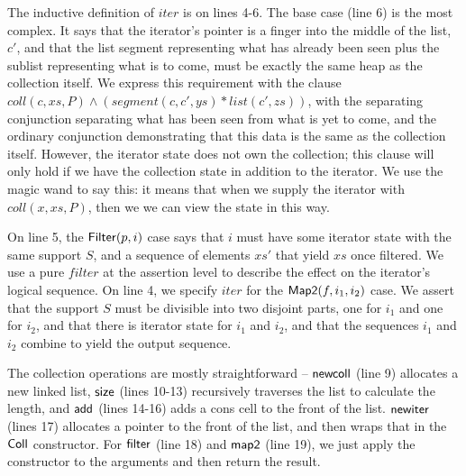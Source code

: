 \documentclass[preprint,natbib]{sigplanconf}
\begin{document}
The inductive definition of $iter$ is on lines 4-6. The base case
(line 6) is the most complex. It says that the iterator's pointer is a
finger into the middle of the list, $c'$, and that the list segment
representing what has already been seen plus the sublist representing
what is to come, must be exactly the same heap as the collection
itself. We express this requirement with the clause $coll(c, xs, P)
\land (segment(c,c',ys) * list(c',zs))$, with the separating
conjunction separating what has been seen from what is yet to come,
and the ordinary conjunction demonstrating that this data is the same
as the collection itself.  However, the iterator state does not own
the collection; this clause will only hold if we have the collection
state in addition to the iterator. We use the magic wand to say this:
it means that when we supply the iterator with $coll(x, xs, P)$, then
we we can view the state in this way.

On line 5, the $\mbox{\textsf{{Filter}}}(p,i)$
case says that $i$ must have some iterator state with the same support
$S$, and a sequence of elements $xs'$ that yield $xs$ once
filtered. We use a pure $filter$ at the assertion level to describe
the effect on the iterator's logical sequence. On line 4, we specify
$iter$ for the $\mbox{\textsf{{Map2}}}(f, i_1, i_2)$ case. We assert that the
support $S$ must be divisible into two disjoint parts, one for $i_1$
and one for $i_2$, and that there is iterator state for $i_1$ and
$i_2$, and that the sequences $i_1$ and $i_2$ combine to yield the
output sequence.

The collection operations are mostly straightforward --
$\mbox{\textsf{{newcoll}}}$ (line 9) allocates a new linked list, $\mbox{\textsf{{size}}}$
(lines 10-13) recursively traverses the list to calculate the length,
and $\mbox{\textsf{{add}}}$ (lines 14-16) adds a cons cell to the front of the
list.  $\mbox{\textsf{{newiter}}}$ (lines 17) allocates a pointer to the front
of the list, and then wraps that in the $\mbox{\textsf{{Coll}}}$
constructor. For $\mbox{\textsf{{filter}}}$ (line 18) and $\mbox{\textsf{{map2}}}$ (line
19), we just apply the constructor to the arguments and then return
the result.
\end{document}

